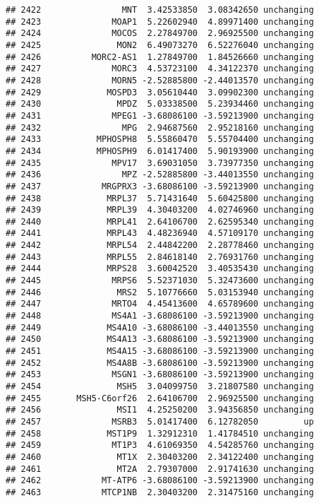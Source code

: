 \documentclass[]{article}
\begin{document}
\begin{verbatim}
## 2422                MNT  3.42533850  3.08342650 unchanging
## 2423              MOAP1  5.22602940  4.89971400 unchanging
## 2424              MOCOS  2.27849700  2.96925500 unchanging
## 2425               MON2  6.49073270  6.52276040 unchanging
## 2426          MORC2-AS1  1.27849700  1.84526660 unchanging
## 2427              MORC3  4.53723100  4.34122370 unchanging
## 2428              MORN5 -2.52885800 -2.44013570 unchanging
## 2429             MOSPD3  3.05610440  3.09902300 unchanging
## 2430               MPDZ  5.03338500  5.23934460 unchanging
## 2431              MPEG1 -3.68086100 -3.59213900 unchanging
## 2432                MPG  2.94687560  2.95218160 unchanging
## 2433           MPHOSPH8  5.55860470  5.55704400 unchanging
## 2434           MPHOSPH9  6.01417400  5.90193900 unchanging
## 2435              MPV17  3.69031050  3.73977350 unchanging
## 2436                MPZ -2.52885800 -3.44013550 unchanging
## 2437            MRGPRX3 -3.68086100 -3.59213900 unchanging
## 2438             MRPL37  5.71431640  5.60425800 unchanging
## 2439             MRPL39  4.30403200  4.02746960 unchanging
## 2440             MRPL41  2.64106700  2.62595340 unchanging
## 2441             MRPL43  4.48236940  4.57109170 unchanging
## 2442             MRPL54  2.44842200  2.28778460 unchanging
## 2443             MRPL55  2.84618140  2.76931760 unchanging
## 2444             MRPS28  3.60042520  3.40535430 unchanging
## 2445              MRPS6  5.52371030  5.32473600 unchanging
## 2446               MRS2  5.10776660  5.03153940 unchanging
## 2447              MRTO4  4.45413600  4.65789600 unchanging
## 2448              MS4A1 -3.68086100 -3.59213900 unchanging
## 2449             MS4A10 -3.68086100 -3.44013550 unchanging
## 2450             MS4A13 -3.68086100 -3.59213900 unchanging
## 2451             MS4A15 -3.68086100 -3.59213900 unchanging
## 2452             MS4A8B -3.68086100 -3.59213900 unchanging
## 2453              MSGN1 -3.68086100 -3.59213900 unchanging
## 2454               MSH5  3.04099750  3.21807580 unchanging
## 2455       MSH5-C6orf26  2.64106700  2.96925500 unchanging
## 2456               MSI1  4.25250200  3.94356850 unchanging
## 2457              MSRB3  5.01417400  6.12782050         up
## 2458             MST1P9  1.32912310  1.41784510 unchanging
## 2459              MT1P3  4.61069350  4.54285760 unchanging
## 2460               MT1X  2.30403200  2.34122400 unchanging
## 2461               MT2A  2.79307000  2.91741630 unchanging
## 2462            MT-ATP6 -3.68086100 -3.59213900 unchanging
## 2463            MTCP1NB  2.30403200  2.31475160 unchanging

\end{verbatim}
\end{document}
